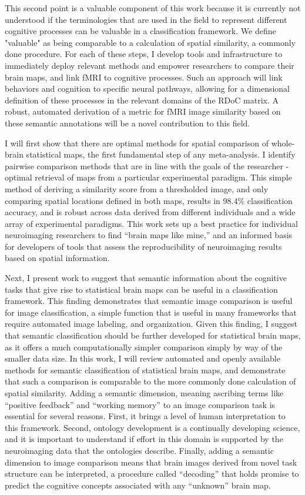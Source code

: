 \documentclass{report}
\begin{document}
This second point is a valuable component of this work because it is currently not understood if the terminologies that are used in the field to represent different cognitive processes can be valuable in a classification framework. We define "valuable" as being comparable to a calculation of spatial similarity, a commonly done procedure. For each of these steps, I develop tools and infrastructure to immediately deploy relevant methods and empower researchers to compare their brain maps, and link fMRI to cognitive processes. Such an approach will link behaviors and cognition to specific neural pathways, allowing for a dimensional definition of these processes in the relevant domains of the RDoC matrix. A robust, automated derivation of a metric for fMRI image similarity based on these semantic annotations will be a novel contribution to this field. 

I will first show that there are optimal methods for spatial comparison of whole-brain statistical maps, the first fundamental step of any meta-analysis. I identify pairwise comparison methods that are in line with the goals of the researcher - optimal retrieval of maps from a particular experimental paradigm. This simple method of deriving a similarity score from a thresholded image, and only comparing spatial locations defined in both maps, results in 98.4\% classification accuracy, and is robust across data derived from different individuals and a wide array of experimental paradigms. This work sets up a best practice for individual neuroimaging researchers to find ``brain maps like mine,'' and an informed basis for developers of tools that assess the reproducibility of neuroimaging results based on spatial information.

Next, I present work to suggest that semantic information about the cognitive tasks that give rise to statistical brain maps can be useful in a classification framework. This finding demonstrates that semantic image comparison is useful for image classification, a simple function that is useful in many frameworks that require automated image labeling, and organization. Given this finding, I suggest that semantic classification should be further developed for statistical brain maps, as it offers a much computationally simpler comparison simply by way of the smaller data size. In this work, I will review automated and openly available methods for semantic classification of statistical brain maps, and demonstrate that such a comparison is comparable to the more commonly done calculation of spatial similarity. Adding a semantic dimension, meaning ascribing terms like ``positive feedback'' and ``working memory'' to an image comparison task is essential for several reasons. First, it brings a level of human interpretation to this framework. Second, ontology development is a continually developing science, and it is important to understand if effort in this domain is supported by the neuroimaging data that the ontologies describe. Finally, adding a semantic dimension to image comparison means that brain images derived from novel task structure can be interpreted, a procedure called ``decoding'' that holds promise to predict the cognitive concepts associated with any ``unknown'' brain map.
\end{document}
